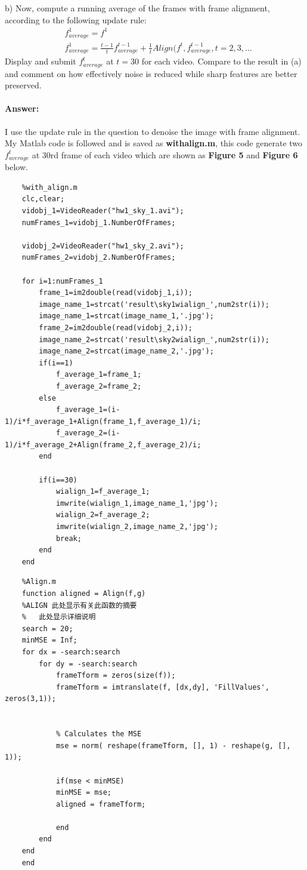 \documentclass[
	12pt, %
]{fphw}
\begin{document}
\begin{problem}
	b)  Now, compute a running average of the frames with frame alignment, according to the following update rule:
	\begin{align*}
		&f^1_{average}=f^1 \\
		&f^1_{average}=\frac{t-1}{t}f^{t-1}_{average}+\frac{1}{t}Align(f^t, f^{t-1}_{average}, t=2,3,\dots
	\end{align*}
	Display and submit $f^t_{average}$ at $t=30$ for each video. Compare to the result in (a) and comment on how effectively noise is reduced while sharp features are better preserved.
\end{problem}



\paragraph*{Answer:}I use the update rule in the question to denoise the image with frame alignment. My Matlab code is followed and is saved as \textbf{with\underline{\hspace{0.5em}}align.m}, this code generate two $f^t_{average}$ at 30rd frame of each video which are shown as \textbf{Figure 5} and \textbf{Figure 6} below.
\begin{lstlisting}
	%with_align.m
	clc,clear;
	vidobj_1=VideoReader("hw1_sky_1.avi");
	numFrames_1=vidobj_1.NumberOfFrames;
	
	vidobj_2=VideoReader("hw1_sky_2.avi");
	numFrames_2=vidobj_2.NumberOfFrames;
	
	for i=1:numFrames_1
		frame_1=im2double(read(vidobj_1,i));
		image_name_1=strcat('result\sky1wialign_',num2str(i));
		image_name_1=strcat(image_name_1,'.jpg');
		frame_2=im2double(read(vidobj_2,i));
		image_name_2=strcat('result\sky2wialign_',num2str(i));
		image_name_2=strcat(image_name_2,'.jpg');
		if(i==1)
			f_average_1=frame_1;
			f_average_2=frame_2;
		else
			f_average_1=(i-1)/i*f_average_1+Align(frame_1,f_average_1)/i;
			f_average_2=(i-1)/i*f_average_2+Align(frame_2,f_average_2)/i;
		end
		
		if(i==30)
			wialign_1=f_average_1;
			imwrite(wialign_1,image_name_1,'jpg');
			wialign_2=f_average_2;
			imwrite(wialign_2,image_name_2,'jpg');
			break;
		end
	end
\end{lstlisting}
\begin{lstlisting}
	%Align.m
	function aligned = Align(f,g)
	%ALIGN 此处显示有关此函数的摘要
	%   此处显示详细说明
	search = 20;
	minMSE = Inf;
	for dx = -search:search
		for dy = -search:search
			frameTform = zeros(size(f));
			frameTform = imtranslate(f, [dx,dy], 'FillValues', zeros(3,1));


			% Calculates the MSE
			mse = norm( reshape(frameTform, [], 1) - reshape(g, [], 1));
			
			if(mse < minMSE)
			minMSE = mse;
			aligned = frameTform;
			
			end
		end
	end
	end
\end{lstlisting}
\end{document}
